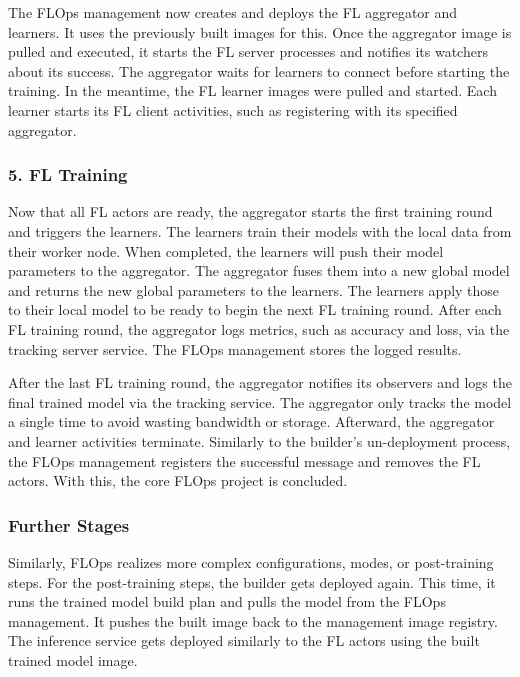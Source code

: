 The FLOps management now creates and deploys the FL aggregator and learners.
It uses the previously built images for this.
Once the aggregator image is pulled and executed, it starts the FL server processes and notifies its watchers about its success.
The aggregator waits for learners to connect before starting the training.
In the meantime, the FL learner images were pulled and started.
Each learner starts its FL client activities, such as registering with its specified aggregator.

\subsubsection{5. FL Training}
Now that all FL actors are ready, the aggregator starts the first training round and triggers the learners.
The learners train their models with the local data from their worker node.
When completed, the learners will push their model parameters to the aggregator.
The aggregator fuses them into a new global model and returns the new global parameters to the learners.
The learners apply those to their local model to be ready to begin the next FL training round.
After each FL training round, the aggregator logs metrics, such as accuracy and loss, via the tracking server service.
The FLOps management stores the logged results.

After the last FL training round, the aggregator notifies its observers and logs the final trained model via the tracking service.
The aggregator only tracks the model a single time to avoid wasting bandwidth or storage.
Afterward, the aggregator and learner activities terminate.
Similarly to the builder's un-deployment process, the FLOps management registers the successful message and removes the FL actors.
With this, the core FLOps project is concluded.

\subsubsection{Further Stages}
Similarly, FLOps realizes more complex configurations, modes, or post-training steps.
For the post-training steps, the builder gets deployed again.
This time, it runs the trained model build plan and pulls the model from the FLOps management.
It pushes the built image back to the management image registry.
The inference service gets deployed similarly to the FL actors using the built trained model image.
